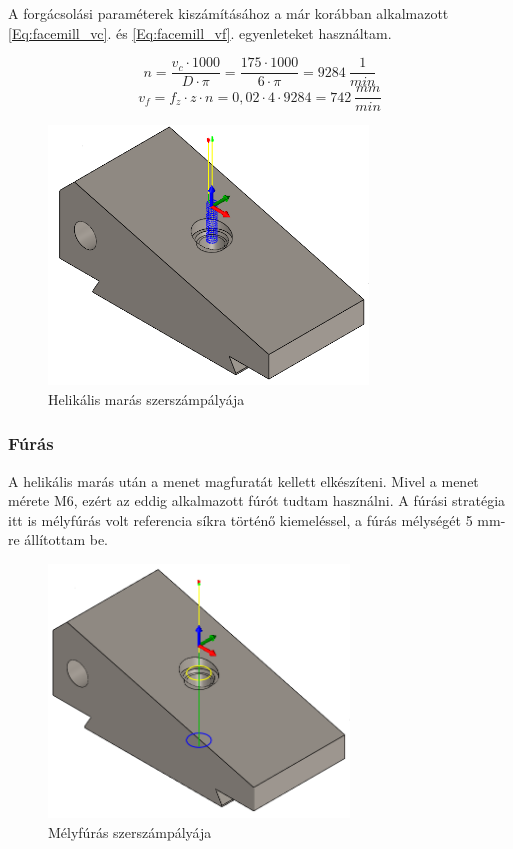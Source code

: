 \documentclass[12pt,a4paper,oneside]{report}
\begin{document}
A forgácsolási paraméterek kiszámításához a már korábban alkalmazott \ref{Eq:facemill_vc}. és \ref{Eq:facemill_vf}. egyenleteket használtam.

\begin{equation*}
    n=\dfrac{v_c\cdot1000}{D\cdot\pi}=\dfrac{175\cdot1000}{6\cdot\pi}=9284\ \dfrac{1}{min}
\end{equation*}
\begin{equation*}
    v_f=f_z\cdot z\cdot n=0,02\cdot4\cdot9284=742\ \dfrac{mm}{min}
\end{equation*}

\begin{figure}[H]
    \centering
    \includegraphics[width=8.5cm]{figures/alaptest_bore.png}
    \caption{Helikális marás szerszámpályája}
    \label{Fig:alaptest_bore}
\end{figure}

\subsubsection{Fúrás}
A helikális marás után a menet magfuratát kellett elkészíteni. Mivel a menet mérete M6, ezért az eddig alkalmazott fúrót tudtam használni. A fúrási stratégia itt is mélyfúrás volt referencia síkra történő kiemeléssel, a fúrás mélységét 5 mm-re állítottam be.

\begin{figure}[H]
    \centering
    \includegraphics[width=8cm]{figures/alaptest_drill_1.png}
    \caption{Mélyfúrás szerszámpályája}
    \label{Fig:alaptest_drill_1}
\end{figure}
\end{document}
